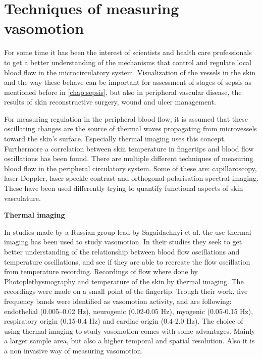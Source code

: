 \section{Techniques of measuring vasomotion}

For some time it has been the interest of scientists and health care professionals to get a better understanding of the mechanisms 
that control and regulate local blood flow in the microcirculatory system\cite{sagaidachnyi2014,sagaidachnyi2017,Geyer2004,liu2012}. 
Visualization of the vessels in the skin and the way these behave can be important for assessment of stages of sepsis as mentioned before in \cref{chap:sepsis}, but also in peripheral vascular disease, the results of skin reconstructive surgery, wound and ulcer management.\cite{liu2012,kanta2014}

For measuring regulation in the peripheral blood flow, it is assumed that these oscillating changes are the source of thermal waves
propagating from microvessels toward the skin’s surface. Especially thermal imaging uses this concept.\cite{sagaidachnyi2017}
Furthermore a correlation between skin temperature in fingertips and blood flow oscillations has been found\cite{sagaidachnyi2014}.
There are multiple different techniques of measuring blood flow in the peripheral circulatory system. Some of these are: capillaroscopy, laser Doppler, laser speckle contrast and orthogonal polarisation spectral imaging. These have been used differently trying to quantify functional aspects of skin vasculature.\cite{liu2012}

\textbf{Thermal imaging}

In studies made by a Russian group lead by Sagaidachnyi et al. the use thermal imaging has been used to study vasomotion. In their studies they seek to get better understanding of the relationship between blood flow oscillations and temperature oscillations, and see if they are able to recreate the flow oscillation from temperature recording. Recordings of flow where done by Photoplethysmography and temperature of the skin by thermal imaging. The recordings were made on a small point of the fingertip. Trough their work, five frequency bands were identified as vasomotion activity, and are following: endothelial (0.005–0.02 Hz), neurogenic (0.02-0.05 Hz), myogenic (0.05-0.15 Hz), respiratory origin (0.15-0.4 Hz) and cardiac origin (0.4-2.0 Hz).\cite{sagaidachnyi2017,sagaidachnyi2014}
The choice of using thermal imaging to study vasomotion comes with some advantages. Mainly a larger sample area, but also a higher temporal and spatial resolution. Also it is a non invasive way of measuring vasomotion.\cite{sagaidachnyi2017}

